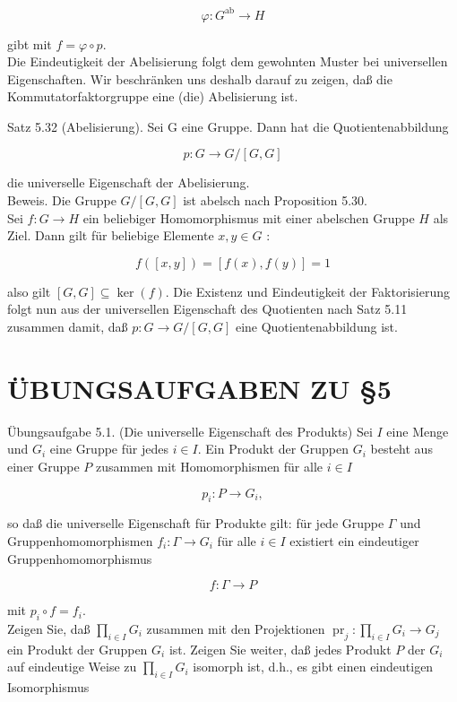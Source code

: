 \documentclass[10pt, letterpaper]{article}
\begin{document}
$$
\varphi: G^{\mathrm{ab}} \rightarrow H
$$

gibt mit $f=\varphi \circ p$.\\
Die Eindeutigkeit der Abelisierung folgt dem gewohnten Muster bei universellen Eigenschaften. Wir beschränken uns deshalb darauf zu zeigen, daß die Kommutatorfaktorgruppe eine (die) Abelisierung ist.

Satz 5.32 (Abelisierung). Sei G eine Gruppe. Dann hat die Quotientenabbildung

$$
p: G \rightarrow G /[G, G]
$$

die universelle Eigenschaft der Abelisierung.\\
Beweis. Die Gruppe $G /[G, G]$ ist abelsch nach Proposition 5.30.\\
Sei $f: G \rightarrow H$ ein beliebiger Homomorphismus mit einer abelschen Gruppe $H$ als Ziel. Dann gilt für beliebige Elemente $x, y \in G$ :

$$
f([x, y])=[f(x), f(y)]=1
$$

also gilt $[G, G] \subseteq \operatorname{ker}(f)$. Die Existenz und Eindeutigkeit der Faktorisierung folgt nun aus der universellen Eigenschaft des Quotienten nach Satz 5.11 zusammen damit, daß $p: G \rightarrow G /[G, G]$ eine Quotientenabbildung ist.

\section*{ÜBUNGSAUFGABEN ZU §5}
Übungsaufgabe 5.1. (Die universelle Eigenschaft des Produkts) Sei $I$ eine Menge und $G_{i}$ eine Gruppe für jedes $i \in I$. Ein Produkt der Gruppen $G_{i}$ besteht aus einer Gruppe $P$ zusammen mit Homomorphismen für alle $i \in I$

$$
p_{i}: P \rightarrow G_{i},
$$

so daß die universelle Eigenschaft für Produkte gilt: für jede Gruppe $\Gamma$ und Gruppenhomomorphismen $f_{i}: \Gamma \rightarrow G_{i}$ für alle $i \in I$ existiert ein eindeutiger Gruppenhomomorphismus

$$
f: \Gamma \rightarrow P
$$

mit $p_{i} \circ f=f_{i}$.\\
Zeigen Sie, daß $\prod_{i \in I} G_{i}$ zusammen mit den Projektionen $\operatorname{pr}_{j}: \prod_{i \in I} G_{i} \rightarrow G_{j}$ ein Produkt der Gruppen $G_{i}$ ist. Zeigen Sie weiter, daß jedes Produkt $P$ der $G_{i}$ auf eindeutige Weise zu $\prod_{i \in I} G_{i}$ isomorph ist, d.h., es gibt einen eindeutigen Isomorphismus
\end{document}
